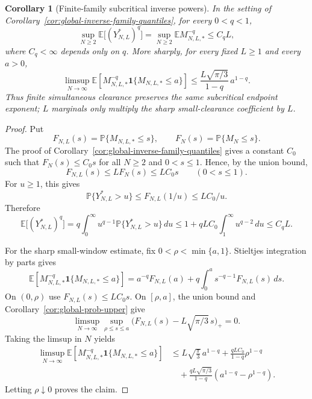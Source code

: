 \documentclass[11pt]{amsart}
\numberwithin{equation}{section}
\newtheorem{corollary}[theorem]{Corollary}
\theoremstyle{definition}
\theoremstyle{remark}
\newcommand{\Prob}{\mathbb P}
\newcommand{\Exp}{\mathbb E}
\begin{document}
\begin{corollary}[Finite-family subcritical inverse powers]
\label{cor:global-inverse-family-subcritical}
In the setting of Corollary~\ref{cor:global-inverse-family-quantiles}, for
every \(0<q<1\),
\[
  \sup_{N\ge2}\Exp\bigl[(Y_{N,L}^*)^q\bigr]
  =
  \sup_{N\ge2}\Exp M_{N,L,*}^{-q}
  \le C_q L,
\]
where \(C_q<\infty\) depends only on \(q\).  More sharply, for every fixed
\(L\ge1\) and every \(a>0\),
\[
  \limsup_{N\to\infty}
  \Exp\!\left[M_{N,L,*}^{-q}\mathbf1\{M_{N,L,*}\le a\}\right]
  \le
  \frac{L\sqrt{\pi/3}}{1-q}\,a^{1-q}.
\]
Thus finite simultaneous clearance preserves the same subcritical endpoint
exponent; \(L\) marginals only multiply the sharp small-clearance coefficient by
\(L\).
\end{corollary}

\begin{proof}
Put
\[
  F_{N,L}(s)=\Prob\{M_{N,L,*}\le s\},
  \qquad F_N(s)=\Prob\{M_N\le s\}.
\]
The proof of Corollary~\ref{cor:global-inverse-family-quantiles} gives a
constant \(C_0\) such that \(F_N(s)\le C_0s\) for all \(N\ge2\) and
\(0<s\le1\).  Hence, by the union bound,
\[
  F_{N,L}(s)\le L F_N(s)\le LC_0s\qquad(0<s\le1).
\]
For \(u\ge1\), this gives
\[
  \Prob\{Y_{N,L}^*>u\}
  \le F_{N,L}(1/u)
  \le LC_0/u.
\]
Therefore
\[
  \Exp\bigl[(Y_{N,L}^*)^q\bigr]
  =
  q\int_0^\infty u^{q-1}\Prob\{Y_{N,L}^*>u\}\,du
  \le
  1+qLC_0\int_1^\infty u^{q-2}\,du
  \le C_q L .
\]

For the sharp small-window estimate, fix
\(0<\rho<\min\{a,1\}\).  Stieltjes integration by parts gives
\[
  \Exp\!\left[M_{N,L,*}^{-q}\mathbf1\{M_{N,L,*}\le a\}\right]
  =
  a^{-q}F_{N,L}(a)+q\int_0^a s^{-q-1}F_{N,L}(s)\,ds .
\]
On \((0,\rho)\) use \(F_{N,L}(s)\le LC_0s\).  On \([\rho,a]\), the union bound
and Corollary~\ref{cor:global-prob-upper} give
\[
  \limsup_{N\to\infty}\sup_{\rho\le s\le a}
  \bigl(F_{N,L}(s)-L\sqrt{\pi/3}\,s\bigr)_+=0 .
\]
Taking the limsup in \(N\) yields
\[
\begin{aligned}
  \limsup_{N\to\infty}
  \Exp\!\left[M_{N,L,*}^{-q}\mathbf1\{M_{N,L,*}\le a\}\right]
  &\le
  L\sqrt{\frac{\pi}{3}}\,a^{1-q}
  +\frac{qLC_0}{1-q}\rho^{1-q}
  \\
  &\quad
  +\frac{qL\sqrt{\pi/3}}{1-q}
  \left(a^{1-q}-\rho^{1-q}\right).
\end{aligned}
\]
Letting \(\rho\downarrow0\) proves the claim.
\end{proof}
\end{document}
